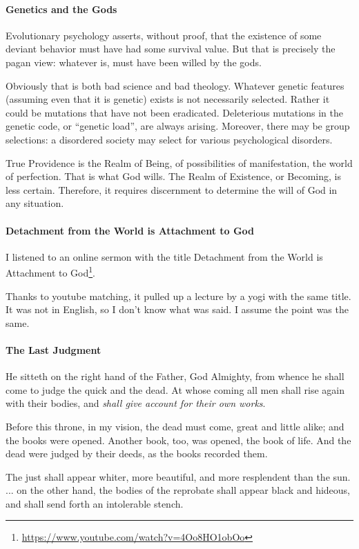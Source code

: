 \paragraph{Genetics and the Gods}


Evolutionary psychology asserts, without proof, that the existence of some deviant behavior must have had some survival value. But that is precisely the pagan view: whatever is, must have been willed by the gods.

Obviously that is both bad science and bad theology. Whatever genetic features (assuming even that it is genetic) exists is not necessarily selected. Rather it could be mutations that have not been eradicated. Deleterious mutations in the genetic code, or ``genetic load'', are always arising. Moreover, there may be group selections: a disordered society may select for various psychological disorders.

True Providence is the Realm of Being, of possibilities of manifestation, the world of perfection. That is what God wills. The Realm of Existence, or Becoming, is less certain. Therefore, it requires discernment to determine the will of God in any situation.

\paragraph{Detachment from the World is Attachment to God}


I listened to an online sermon with the title Detachment from the World is Attachment to God\footnote{\url{https://www.youtube.com/watch?v=4Oo8HO1obOo}}.

Thanks to youtube matching, it pulled up a lecture by a yogi with the same title. It was not in English, so I don't know what was said. I assume the point was the same.

\paragraph{The Last Judgment}


\begin{quotex}
He sitteth on the right hand of the Father, God Almighty, from whence he shall come to judge the quick and the dead. At whose coming all men shall rise again with their bodies, and \emph{shall give account for their own works}.

Before this throne, in my vision, the dead must come, great and little alike; and the books were opened. Another book, too, was opened, the book of life. And the dead were judged by their deeds, as the books recorded them.

The just shall appear whiter, more beautiful, and more resplendent than the sun. ... on the other hand, the bodies of the reprobate shall appear black and hideous, and shall send forth an intolerable stench.
\end{quotex}


